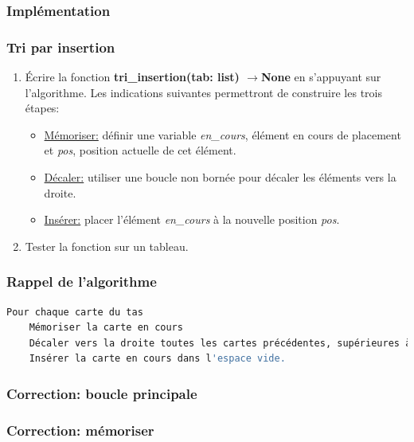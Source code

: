 \documentclass[svgnames,11pt]{beamer}
\begin{document}
\subsubsection{Implémentation}
\begin{frame}
    \frametitle{Tri par insertion}

    \begin{activite}
        \begin{enumerate}
            \item Écrire la fonction \textbf{tri\_insertion(tab: list) $\rightarrow$None} en s'appuyant sur l'algorithme. Les indications suivantes permettront de construire les trois étapes:
                  \begin{itemize}
                      \item \underline{Mémoriser:} définir une variable \emph{en\_cours}, élément en cours de placement et \emph{pos}, position actuelle de cet élément.
                      \item \underline{Décaler:} utiliser une boucle non bornée pour décaler les éléments vers la droite.
                      \item \underline{Insérer:} placer l'élément \emph{en\_cours} à la nouvelle position \emph{pos}.
                  \end{itemize}
            \item Tester la fonction sur un tableau.
        \end{enumerate}
    \end{activite}

\end{frame}

\begin{frame}[fragile]
    \frametitle{Rappel de l'algorithme}

    \begin{center}
        \begin{lstlisting}[language=bash, basicstyle=\small, xrightmargin=1em]
Pour chaque carte du tas
    Mémoriser la carte en cours
    Décaler vers la droite toutes les cartes précédentes, supérieures à la carte en cours.
    Insérer la carte en cours dans l'espace vide.
        \end{lstlisting}
        \label{CODE}
    \end{center}

\end{frame}

\begin{frame}
    \frametitle{Correction: boucle principale}

    

\end{frame}
\begin{frame}
    \frametitle{Correction: mémoriser}

    

\end{frame}
\end{document}

